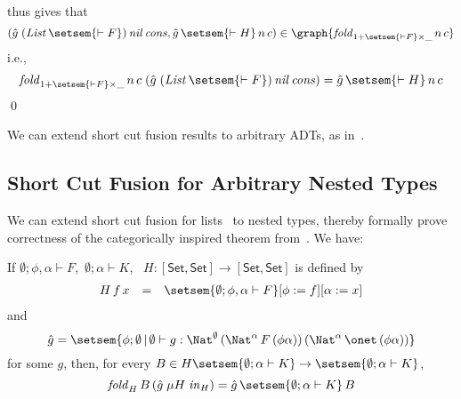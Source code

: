 \documentclass{lmcs}
\theoremstyle{plain}\newtheorem{satz}[thm]{Satz}
\newcommand{\set}{\mathsf{Set}}
\begin{document}
thus gives that \[(\hat{g}\;(\mathit{List}\,\setsem{\vdash
  F})\,\mathit{nil} \,\mathit{cons}, \hat{g} \,\setsem{\vdash H} \,
n\, c) \in \graph{\mathit{fold}_{1 + \setsem{\vdash F} \times \_}\,
  n\, c}\]
i.e.,
\[\mathit{fold}_{1 + \setsem{\vdash F} \times \_}\, n\, c\; (\hat{g}\;
(\mathit{List}\,\setsem{\vdash F})\, \mathit{nil}\, \mathit{cons})
= \hat{g}\,\setsem{\vdash H}\, n\, c\]
\qed

We can extend short cut fusion results to arbitrary ADTs, as
in~\cite{joh02,pit98}.

\subsection{Short Cut Fusion for Arbitrary Nested
  Types}\label{sec:short-cut-nested} 

We can extend short cut fusion for lists~\cite{glp93} to nested types,
thereby formally prove correctness of the categorically inspired
theorem from~\cite{jg10}.  We have:
\begin{thm}\label{thm:short-cut-nested}
If $\emptyset;\phi,\alpha \vdash F$, \,$\emptyset; \alpha
\vdash K$, \,
$H : [\set,\set] \to [\set,\set]$ is defined by
\[\begin{array}{lll}
H\,f\,x & = & \setsem{\emptyset; \phi, \alpha \vdash F}[\phi :=
  f][\alpha := x]\\
\end{array}\]
and 
\[\hat{g} = \setsem{\phi;\emptyset\,|\,\emptyset \vdash g :
\Nat^\emptyset\,(\Nat^\alpha\,F\,(\phi\alpha))\,(\Nat^\alpha\,\onet \,
(\phi\alpha))}\] for some $g$, then, for every $B \in H
\setsem{\emptyset;\alpha \vdash K} \rightarrow \setsem{\emptyset;
  \alpha \vdash K}$,
$$\mathit{fold}_{H}\, B \, (\hat{g}\; \mu H \; \mathit{in}_{H}) = \hat{g}
\,\setsem{\emptyset;\alpha \vdash K}\, B$$
\end{thm}
\end{document}
